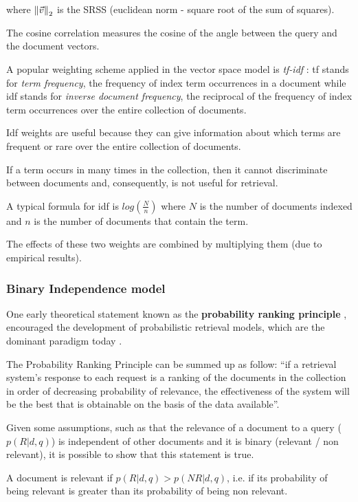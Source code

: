 where $\left\lVert\vec{v}\right\rVert_2$ is the SRSS (euclidean norm - square root of the sum of squares).

The cosine correlation measures the cosine of the angle between the query and the document vectors.

A popular weighting scheme applied in the vector space model is \textit{tf-idf} \cite{croftIR}: tf stands for \textit{term frequency}, the frequency of index term occurrences in a document while idf stands for \textit{inverse document frequency}, the reciprocal of the frequency of index term occurrences over the entire collection of documents.

Idf weights are useful because they can give information about which terms are frequent or rare over the entire collection of documents.

If a term occurs in many times in the collection, then it cannot discriminate between documents and, consequently, is not useful for retrieval.

A typical formula for idf is $log \left( \frac{N}{n} \right)$ where $N$ is the number of documents indexed and $n$ is the number of documents that contain the term.

The effects of these two weights are combined by multiplying them (due to empirical results).

\subsubsection{Binary Independence model}

One early theoretical statement known as the \textbf{probability ranking principle} \cite{robertson}, encouraged the development of probabilistic retrieval models, which are the dominant paradigm today \cite{croftIR}.

The Probability Ranking Principle can be summed up as follow: ``if a retrieval system's response to each request is a ranking of the documents in the collection in order of decreasing probability of relevance, the effectiveness of the system will be the best that is obtainable on the basis of the data available''.

Given some assumptions, such as that the relevance of a document to a query ($p(R|d, q)$) is independent of other documents and it is binary (relevant / non relevant), it is possible to show that this statement is true.

A document is relevant if $p(R| d, q) > p(NR| d, q)$, i.e. if its probability of being relevant is greater than its probability of being non relevant.

